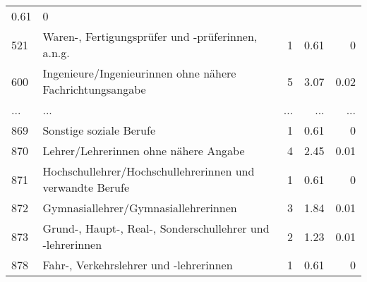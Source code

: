 \begin{longtable}{lXrrr}
          \num[round-mode=places,round-precision=2]{0.61} &
          \num[round-mode=places,round-precision=2]{0} \\
        521 & \multicolumn{1}{X}{Waren-, Fertigungsprüfer und -prüferinnen, a.n.g.} & %
          \num{1} &
          \num[round-mode=places,round-precision=2]{0.61} &
          \num[round-mode=places,round-precision=2]{0} \\
        600 & \multicolumn{1}{X}{Ingenieure/Ingenieurinnen ohne nähere Fachrichtungsangabe} & %
          \num{5} &
          \num[round-mode=places,round-precision=2]{3.07} &
          \num[round-mode=places,round-precision=2]{0.02} \\
       ... & ... & ... & ... & ... \\
        869 & \multicolumn{1}{X}{Sonstige soziale Berufe} & %
          \num{1} &
          \num[round-mode=places,round-precision=2]{0.61} &
          \num[round-mode=places,round-precision=2]{0} \\

        870 & \multicolumn{1}{X}{Lehrer/Lehrerinnen ohne nähere Angabe} & %
          \num{4} &
          \num[round-mode=places,round-precision=2]{2.45} &
          \num[round-mode=places,round-precision=2]{0.01} \\

        871 & \multicolumn{1}{X}{Hochschullehrer/Hochschullehrerinnen und verwandte Berufe} & %
          \num{1} &
          \num[round-mode=places,round-precision=2]{0.61} &
          \num[round-mode=places,round-precision=2]{0} \\

        872 & \multicolumn{1}{X}{Gymnasiallehrer/Gymnasiallehrerinnen} & %
          \num{3} &
          \num[round-mode=places,round-precision=2]{1.84} &
          \num[round-mode=places,round-precision=2]{0.01} \\

        873 & \multicolumn{1}{X}{Grund-, Haupt-, Real-, Sonderschullehrer und -lehrerinnen} & %
          \num{2} &
          \num[round-mode=places,round-precision=2]{1.23} &
          \num[round-mode=places,round-precision=2]{0.01} \\

        878 & \multicolumn{1}{X}{Fahr-, Verkehrslehrer und -lehrerinnen} & %
          \num{1} &
          \num[round-mode=places,round-precision=2]{0.61} &
          \num[round-mode=places,round-precision=2]{0} \\


\end{longtable}
